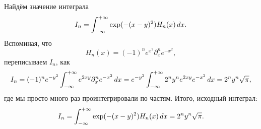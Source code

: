 Найдём значение интеграла 
\begin{equation*}
    I_n = \int_{-\infty}^{+\infty} \exp(-(x-y)^2) H_n (x) \, d x.
\end{equation*}
Вспоминая, что
\begin{equation*}
    H_n (x) = (-1)^n e^{x^2} \partial_x^n e^{-x^2},
\end{equation*}
переписываем $I_n$, как
\begin{equation*}
    I_n = (-1)^n e^{-y^2} \int_{-\infty}^{+\infty}  e^{2 xy} \partial_x^n e^{-x^2} \, d x = e^{-y^2} \int_{-\infty}^{+\infty} 2^n y^n e^{2xy} e^{-x^2} \, d x = 2^n y^n \sqrt{\pi},
\end{equation*}
где мы просто много раз проинтегрировали по частям. Итого, исходный интеграл:
\begin{equation*}
    I_n =\int_{-\infty}^{+\infty} \exp(-(x-y)^2) H_n (x) \, d x= 2^n y^n \sqrt{\pi}.
\end{equation*}